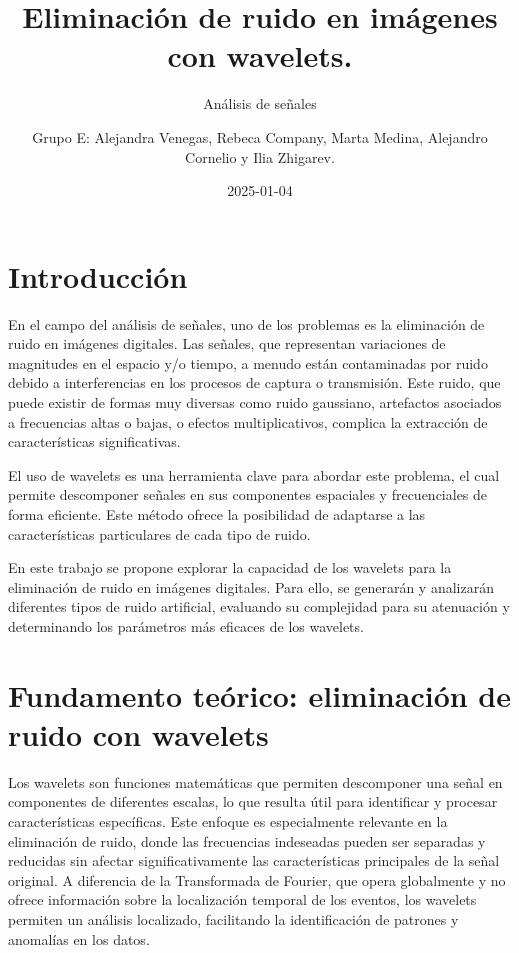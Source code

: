 \documentclass[
]{article}
\title{Eliminación de ruido en imágenes con wavelets.}
\subtitle{Análisis de señales}
\author{Grupo E: Alejandra Venegas, Rebeca Company, Marta Medina,
Alejandro Cornelio y Ilia Zhigarev.}
\date{2025-01-04}
\begin{document}
\maketitle

{
\setcounter{tocdepth}{3}
\tableofcontents
}
\section{Introducción}\label{introducciuxf3n}

En el campo del análisis de señales, uno de los problemas es la
eliminación de ruido en imágenes digitales. Las señales, que representan
variaciones de magnitudes en el espacio y/o tiempo, a menudo están
contaminadas por ruido debido a interferencias en los procesos de
captura o transmisión. Este ruido, que puede existir de formas muy
diversas como ruido gaussiano, artefactos asociados a frecuencias altas
o bajas, o efectos multiplicativos, complica la extracción de
características significativas.

El uso de wavelets es una herramienta clave para abordar este problema,
el cual permite descomponer señales en sus componentes espaciales y
frecuenciales de forma eficiente. Este método ofrece la posibilidad de
adaptarse a las características particulares de cada tipo de ruido.

En este trabajo se propone explorar la capacidad de los wavelets para la
eliminación de ruido en imágenes digitales. Para ello, se generarán y
analizarán diferentes tipos de ruido artificial, evaluando su
complejidad para su atenuación y determinando los parámetros más
eficaces de los wavelets.

\section{Fundamento teórico: eliminación de ruido con
wavelets}\label{fundamento-teuxf3rico-eliminaciuxf3n-de-ruido-con-wavelets}

Los wavelets son funciones matemáticas que permiten descomponer una
señal en componentes de diferentes escalas, lo que resulta útil para
identificar y procesar características específicas. Este enfoque es
especialmente relevante en la eliminación de ruido, donde las
frecuencias indeseadas pueden ser separadas y reducidas sin afectar
significativamente las características principales de la señal original.
A diferencia de la Transformada de Fourier, que opera globalmente y no
ofrece información sobre la localización temporal de los eventos, los
wavelets permiten un análisis localizado, facilitando la identificación
de patrones y anomalías en los datos.
\end{document}
